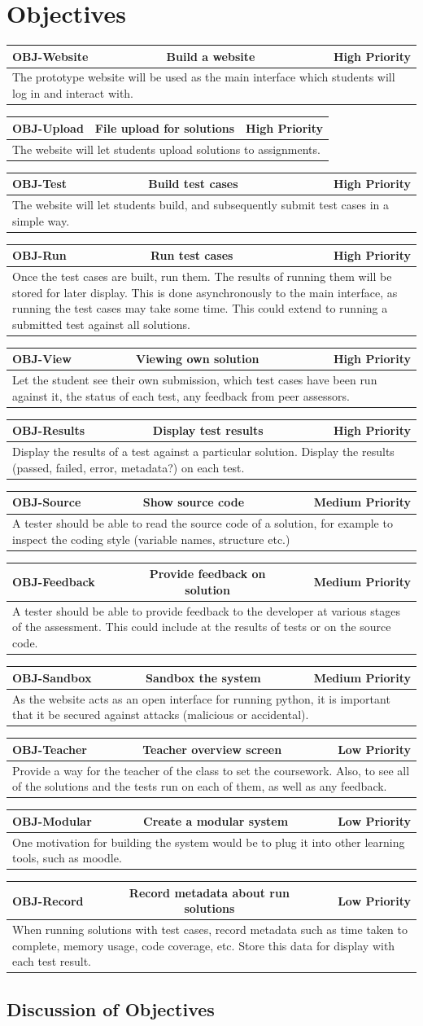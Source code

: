 \documentclass[a4paper,11pt]{report}
\newcommand{\objitem}[4]{\begin{tabularx}{\textwidth}{|l|cr|} \hline \textbf{OBJ-#1} & #2 & #3 \\ \hline \multicolumn{3}{|X|}{#4} \\ \hline \end{tabularx}}
\begin{document}
\section{Objectives}
\objitem{Website}{Build a website}{High Priority}{The prototype website will be used as the main interface which students will log in and interact with.}
\objitem{Upload}{File upload for solutions}{High Priority}{The website will let students upload solutions to assignments.}
\objitem{Test}{Build test cases}{High Priority}{The website will let students build, and subsequently submit test cases in a simple way.}
\objitem{Run}{Run test cases}{High Priority}{Once the test cases are built, run them. The results of running them will be stored for later display. This is done asynchronously to the main interface, as running the test cases may take some time. This could extend to running a submitted test against all solutions.}
\objitem{View}{Viewing own solution}{High Priority}{Let the student see their own submission, which test cases have been run against it, the status of each test, any feedback from peer assessors.}
\objitem{Results}{Display test results}{High Priority}{Display the results of a test against a particular solution. Display the results (passed, failed, error, metadata?) on each test.}
\objitem{Source}{Show source code}{Medium Priority}{A tester should be able to read the source code of a solution, for example to inspect the coding style (variable names, structure etc.)}
\objitem{Feedback}{Provide feedback on solution}{Medium Priority}{A tester should be able to provide feedback to the developer at various stages of the assessment. This could include at the results of tests or on the source code.}
\objitem{Sandbox}{Sandbox the system}{Medium Priority}{As the website acts as an open interface for running python, it is important that it be secured against attacks (malicious or accidental).}
\objitem{Teacher}{Teacher overview screen}{Low Priority}{Provide a way for the teacher of the class to set the coursework. Also, to see all of the solutions and the tests run on each of them, as well as any feedback.}
\objitem{Modular}{Create a modular system}{Low Priority}{One motivation for building the system would be to plug it into other learning tools, such as moodle.}
\objitem{Record}{Record metadata about run solutions}{Low Priority}{When running solutions with test cases, record metadata such as time taken to complete, memory usage, code coverage, etc. Store this data for display with each test result.}

\subsection{Discussion of Objectives}
\end{document}
